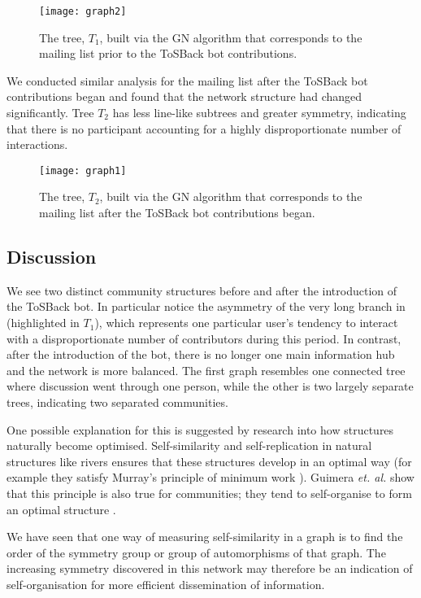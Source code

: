 \documentclass{sig-alternate}
\begin{document}
\begin{figure}[H]
\texttt{[image: graph2]}\caption{ The tree, $T_1$, built via the GN algorithm that corresponds to the mailing list prior to the ToSBack bot contributions.}\label{fig:t1}
\end{figure}

We conducted similar analysis for the mailing list after the ToSBack bot contributions began and found that the network structure had changed significantly. Tree $T_2$ has less line-like subtrees and greater symmetry, indicating that there is no participant accounting for a highly disproportionate number of interactions.

\begin{figure}[H]
\texttt{[image: graph1]}\caption[width=7]{ The tree, $T_2$, built via the GN algorithm that corresponds to the mailing list after the ToSBack bot contributions began. }\label{fig:t2}
\end{figure}


\subsection{Discussion}

We see two distinct community structures before and after the introduction of the ToSBack bot. In particular notice the asymmetry of the very long branch in (highlighted in $T_1$), which represents one particular user's tendency to interact with a disproportionate number of contributors during this period. In contrast, after the introduction of the bot, there is no longer one main information hub and the network is more balanced. The first graph resembles one connected tree where discussion went through one person, while the other is two largely separate trees, indicating two separated communities.

One possible explanation for this is suggested by research into how structures naturally become optimised. Self-similarity and self-replication in natural structures like rivers ensures that these structures develop in an optimal way (for example they satisfy Murray's principle of minimum work \cite{murray:min}). Guimera \emph{et. al.} show that this principle is also true for communities; they tend to self-organise to form an optimal structure \cite{guimera:comm}.

We have seen that one way of measuring self-similarity in a graph is to find the order of the symmetry group or group of automorphisms of that graph. The increasing symmetry discovered in this network may therefore be an indication of self-organisation for more efficient dissemination of information. 
\end{document}
